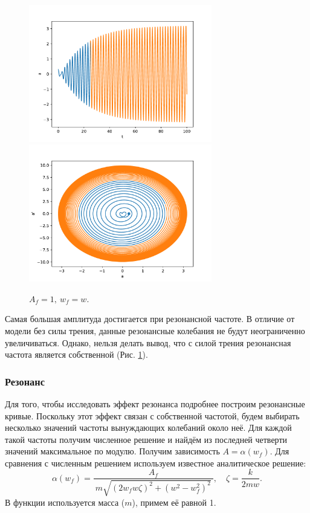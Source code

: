             \begin{figure}[H]
                \centering
                \includegraphics[width=8cm]{pictures/5resonance3.pdf}
                \includegraphics[width=8cm]{pictures/5resonance3p.pdf}
                \caption{$A_f = 1, ~ w_f = w$.}\label{kw1w}
            \end{figure}
            Самая большая амплитуда достигается при резонансной частоте. В отличие от модели без силы трения, данные резонансные колебания не будут неограниченно увеличиваться. Однако, нельзя делать вывод, что с силой трения резонансная частота является собственной (Рис. \ref{kw1w}).

        \subsubsection{Резонанс}
            Для того, чтобы исследовать эффект резонанса подробнее построим резонансные кривые. Поскольку этот эффект связан с собственной частотой, будем выбирать несколько значений частоты вынуждающих колебаний около неё. Для каждой такой частоты получим численное решение и найдём из последней четверти значений максимальное по модулю. Получим зависимость \( A = \alpha (w_f) \). Для сравнения с численным решением используем известное аналитическое решение:
            \[
                \alpha (w_f) = \frac{A_f}{~m\sqrt{ \left( 2 w_f w \zeta \right)^2 + \left( w^2 - w_f^2 \right)^2 }~}, \quad \zeta = \frac{k}{2 m w}.
            \]
            В функции используется масса (\( m \)), примем её равной 1.

